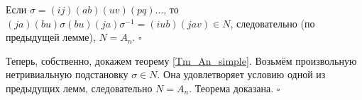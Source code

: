 Если
\(\sigma = \left( {{ij}} \right)\left( {{ab}} \right)\left( {{uv}} \right)\left( {{pq}} \right)\ldots\),
то
\((ja)(bu)\sigma(bu)\left( {{ja}} \right)\sigma^{-1} = \left( {{iub}} \right)\left( {{jav}} \right) \in N\),
следовательно (по предыдущей лемме), \(N = A_{n}\).
$\square$
\medskip

Теперь, собственно, докажем теорему \ref{Tm_An_simple}. Возьмём произвольную нетривиальную подстановку
\(\sigma \in N\). Она удовлетворяет условию одной из предыдущих лемм, следовательно \(N = A_{n}\). Теорема доказана. $\square$
\medskip
